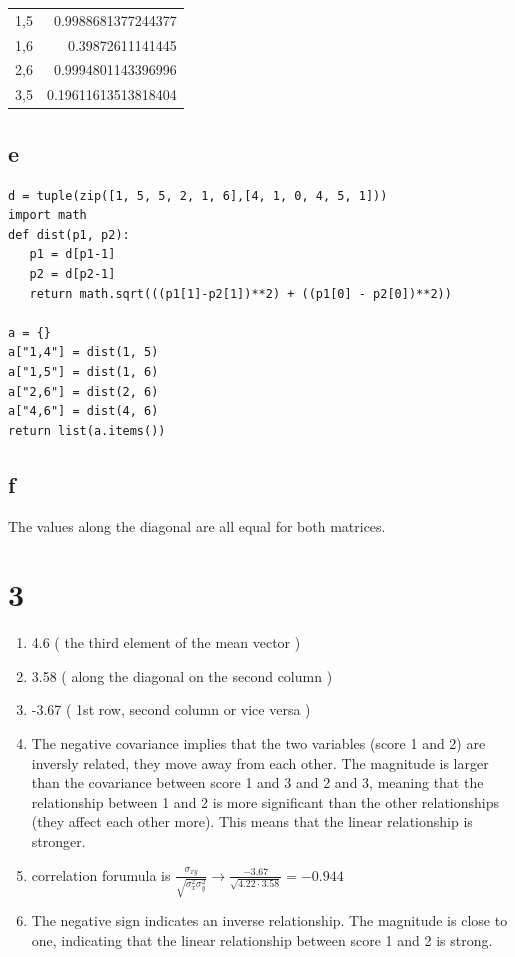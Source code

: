 \documentclass[11pt]{article}
\begin{document}
\begin{center}
\begin{tabular}{lr}
1,5 & 0.9988681377244377\\
1,6 & 0.39872611141445\\
2,6 & 0.9994801143396996\\
3,5 & 0.19611613513818404\\
\end{tabular}
\end{center}
\subsection{e}
\label{sec:org37fa21d}
\begin{verbatim}
d = tuple(zip([1, 5, 5, 2, 1, 6],[4, 1, 0, 4, 5, 1]))
import math
def dist(p1, p2):
   p1 = d[p1-1]
   p2 = d[p2-1]
   return math.sqrt(((p1[1]-p2[1])**2) + ((p1[0] - p2[0])**2))

a = {}
a["1,4"] = dist(1, 5)
a["1,5"] = dist(1, 6)
a["2,6"] = dist(2, 6)
a["4,6"] = dist(4, 6)
return list(a.items())

\end{verbatim}
\subsection{f}
\label{sec:org6bbd8a3}
The values along the diagonal are all equal for both matrices.
\section{3}
\label{sec:org3514a77}
\begin{enumerate}
\item 4.6 ( the third element of the mean vector )
\item 3.58 ( along the diagonal on the second column )
\item -3.67 ( 1st row, second column or vice versa )
\item The negative covariance implies that the two variables (score 1 and 2) are
inversly related, they move away from each other. The magnitude is larger than the covariance between score 1
and 3 and 2 and 3, meaning that the relationship between 1 and 2 is more
significant than the other relationships (they affect each other more). This
means that the linear relationship is stronger.
\item correlation forumula is \(\frac{\sigma_{xy}}{\sqrt{\sigma^2_x \sigma^2_y}} \rightarrow
   \frac{-3.67}{\sqrt{4.22 \cdot 3.58}} = -0.944\)
\item The negative sign indicates an inverse relationship. The magnitude is close
to one, indicating that the linear relationship between score 1 and 2 is strong.
\end{enumerate}
\end{document}

